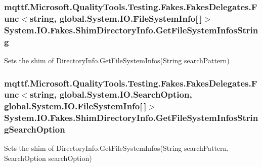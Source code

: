 \hypertarget{class_system_1_1_i_o_1_1_fakes_1_1_shim_directory_info_a29fbc94987a31f97f8d2eabf8ab9fc49}{
\subsubsection[{Get\-File\-System\-Infos\-String}]{\setlength{\rightskip}{0pt plus 5cm}mqttf.\-Microsoft.\-Quality\-Tools.\-Testing.\-Fakes.\-Fakes\-Delegates.\-Func$<$string, global.\-System.\-I\-O.\-File\-System\-Info\mbox{[}$\,$\mbox{]}$>$ System.\-I\-O.\-Fakes.\-Shim\-Directory\-Info.\-Get\-File\-System\-Infos\-String\hspace{0.3cm}{\ttfamily [set]}}}\label{class_system_1_1_i_o_1_1_fakes_1_1_shim_directory_info_a29fbc94987a31f97f8d2eabf8ab9fc49}


Sets the shim of Directory\-Info.\-Get\-File\-System\-Infos(\-String search\-Pattern)

\hypertarget{class_system_1_1_i_o_1_1_fakes_1_1_shim_directory_info_aa38463c66c3c648735e3f9443be12f13}{
\subsubsection[{Get\-File\-System\-Infos\-String\-Search\-Option}]{\setlength{\rightskip}{0pt plus 5cm}mqttf.\-Microsoft.\-Quality\-Tools.\-Testing.\-Fakes.\-Fakes\-Delegates.\-Func$<$string, global.\-System.\-I\-O.\-Search\-Option, global.\-System.\-I\-O.\-File\-System\-Info\mbox{[}$\,$\mbox{]}$>$ System.\-I\-O.\-Fakes.\-Shim\-Directory\-Info.\-Get\-File\-System\-Infos\-String\-Search\-Option\hspace{0.3cm}{\ttfamily [set]}}}\label{class_system_1_1_i_o_1_1_fakes_1_1_shim_directory_info_aa38463c66c3c648735e3f9443be12f13}


Sets the shim of Directory\-Info.\-Get\-File\-System\-Infos(\-String search\-Pattern, Search\-Option search\-Option)

